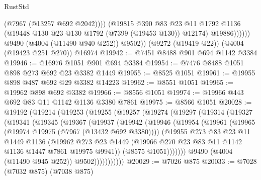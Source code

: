 \begin{lexlean}{RustStd}
\begin{coremodule}
                      (@7967 (@13257 @692 @2042))))
                  (@19815
                    @390
                    @83
                    @23
                    @11
                    @1792
                    @1136
                    (@19448 @130 @23 @130 @1792 (@7399 (@19453 @130)) @12174)
                    @19886))))))
        @9490
        (@4004 (@11490 @940 @252))
        @9502))
    (@9272 (@19419 @22))
    (@4004 (@19423 @251 @270))
    @16974
@19942 := @7451 @8488 @901 @694 @1142 @3384
@19946 := @16976 @1051 @901 @694 @3384
@19954 := @7476 @8488 @1051 @898 @273 @692 @23 @3382 @1449
@19955 := @8525 @1051
@19961 := @19955 @898 @487 @692 @29 @3382 @14223
@19962 := @8551 @1051
@19965 := @19962 @898 @692 @3382
@19966 := @8556 @1051
@19974 := @19966 @443 @692 @83 @11 @1142 @1136 @3380 @7861
@19975 := @8566 @1051
@20028 := @19192
    (@19214
      (@19253
        (@19255
          (@19257
            (@19274
              (@19297
                (@19314
                  (@19327
                    (@19341
                      (@19345
                        (@19367
                          (@19937
                            (@19942
                              (@19946
                                (@19954
                                  (@19961
                                    (@19965 (@19974 @19975 (@7967 (@13432 @692 @3380))))
                                    (@19955
                                      @273
                                      @83
                                      @23
                                      @11
                                      @1449
                                      @1136
                                      (@19962
                                        @273
                                        @23
                                        @1449
                                        (@19966
                                          @270
                                          @23
                                          @83
                                          @11
                                          @1142
                                          @1136
                                          @1447
                                          @7861
                                          @19975
                                          @9941))
                                      (@8575 @1051)))))))
                          @9490
                          (@4004 (@11490 @945 @252))
                          @9502)))))))))))
@20029 := @7026 @875
@20033 := @7028 (@7032 @875) (@7038 @875)

\end{coremodule}
\end{lexlean}
